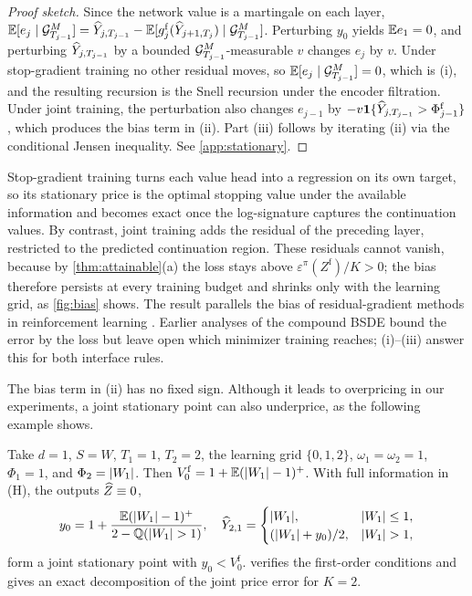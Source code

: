 \begin{proof}[Proof sketch]
Since the network value is a martingale on each layer, $\mathbb{E}[e_j\mid\mathcal{G}^M_{T_{j-1}}]=\widehat Y_{j,T_{j-1}}-\mathbb{E}[g^{\mathrm f}_j(\widehat Y_{j+1,T_j})\mid\mathcal{G}^M_{T_{j-1}}]$. Perturbing $y_0$ yields $\mathbb{E} e_1=0$, and perturbing $\widehat Y_{j,T_{j-1}}$ by a bounded $\mathcal{G}^M_{T_{j-1}}$-measurable $v$ changes $e_j$ by $v$. Under stop-gradient training no other residual moves, so $\mathbb{E}[e_j\mid\mathcal{G}^M_{T_{j-1}}]=0$, which is (i), and the resulting recursion is the Snell recursion under the encoder filtration. Under joint training, the perturbation also changes $e_{j-1}$ by $-v\mathbf{1}\{\widehat Y_{j,T_{j-1}}>\Phi^{\mathrm f}_{j-1}\}$, which produces the bias term in (ii). Part (iii) follows by iterating (ii) via the conditional Jensen inequality. See \cref{app:stationary}.
\end{proof}

\begin{remark}\label{rem:stationary}
Stop-gradient training turns each value head into a regression on its own target, so its stationary price is the optimal stopping value under the available information and becomes exact once the log-signature captures the continuation values. By contrast, joint training adds the residual of the preceding layer, restricted to the predicted continuation region. These residuals cannot vanish, because by \cref{thm:attainable}(a) the loss stays above $\varepsilon^\pi(Z^{\mathrm f})/K>0$; the bias therefore persists at every training budget and shrinks only with the learning grid, as \cref{fig:bias} shows. The result parallels the bias of residual-gradient methods in reinforcement learning \cite{baird1995,sutton2018}. Earlier analyses of the compound BSDE \cite{huang2026} bound the error by the loss but leave open which minimizer training reaches; (i)--(iii) answer this for both interface rules.
\end{remark}

The bias term in (ii) has no fixed sign. Although it leads to overpricing in our experiments, a joint stationary point can also underprice, as the following example shows.

\begin{example}\label{ex:downward}
Take $d=1$, $S=W$, $T_1=1$, $T_2=2$, the learning grid $\{0,1,2\}$, $\omega_1=\omega_2=1$, $\Phi_1=1$, and $\Phi_2=\lvert W_1\rvert$. Then $V^{\mathrm f}_0=1+\mathbb{E}(\lvert W_1\rvert-1)^+$. With full information in (H), the outputs $\widehat Z\equiv0$,
\[
y_0=1+\frac{\mathbb{E}(\lvert W_1\rvert-1)^+}{2-\mathbb{Q}(\lvert W_1\rvert>1)},\quad
\widehat Y_{2,1}=\begin{cases}\lvert W_1\rvert,&\lvert W_1\rvert\le1,\\(\lvert W_1\rvert+y_0)/2,&\lvert W_1\rvert>1,\end{cases}
\]
form a joint stationary point with $y_0<V^{\mathrm f}_0$.  verifies the first-order conditions and gives an exact decomposition of the joint price error for $K=2$.
\end{example}

